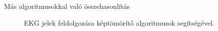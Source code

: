 \documentclass{beamer}
\begin{document}
\begin{frame}{Más algoritmusokkal való összehasonlítás}
\begin{figure}
	\caption{EKG jelek feldolgozása képtömörítő algoritmusok segítségével.}
\end{figure}
\end{frame}
\end{document}

